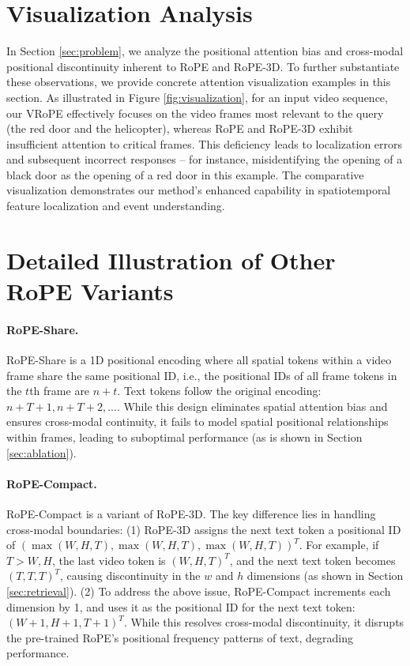 \documentclass[11pt]{article}
\newcommand{\methodname}{VRoPE\xspace}
\begin{document}
\section{Visualization Analysis}
\label{sec:visualization}

In Section \ref{sec:problem}, we analyze the positional attention bias and cross-modal positional discontinuity inherent to RoPE and RoPE-3D. To further substantiate these observations, we provide concrete attention visualization examples in this section. As illustrated in Figure \ref{fig:visualization}, for an input video sequence, our \methodname effectively focuses on the video frames most relevant to the query (the red door and the helicopter), whereas RoPE and RoPE-3D exhibit insufficient attention to critical frames. This deficiency leads to localization errors and subsequent incorrect responses – for instance, misidentifying the opening of a black door as the opening of a red door in this example. The comparative visualization demonstrates our method's enhanced capability in spatiotemporal feature localization and event understanding.

\section{Detailed Illustration of Other RoPE Variants}
\label{sec:other_ropes}

\paragraph{RoPE-Share.}
RoPE-Share is a 1D positional encoding where all spatial tokens within a video frame share the same positional ID, i.e., the positional IDs of all frame tokens in the $t$th frame are $n + t$. Text tokens follow the original encoding: $n + T + 1, n + T + 2, ...$. While this design eliminates spatial attention bias and ensures cross-modal continuity, it fails to model spatial positional relationships within frames, leading to suboptimal performance (as is shown in Section \ref{sec:ablation}).

\paragraph{RoPE-Compact.}
RoPE-Compact is a variant of RoPE-3D. The key difference lies in handling cross-modal boundaries: (1) RoPE-3D assigns the next text token a positional ID of $(\max(W, H, T), \max(W, H, T), \max(W, H, T))^{T}$. For example, if $ T > W, H $, the last video token is $ (W, H, T)^{T} $, and the next text token becomes $ (T, T, T)^{T} $, causing discontinuity in the $ w $ and $ h $ dimensions (as shown in Section \ref{sec:retrieval}). (2) To address the above issue, RoPE-Compact increments each dimension by 1, and uses it as the positional ID for the next text token: $(W + 1, H + 1, T + 1)^{T}$. While this resolves cross-modal discontinuity, it disrupts the pre-trained RoPE’s positional frequency patterns of text, degrading performance.
\end{document}
